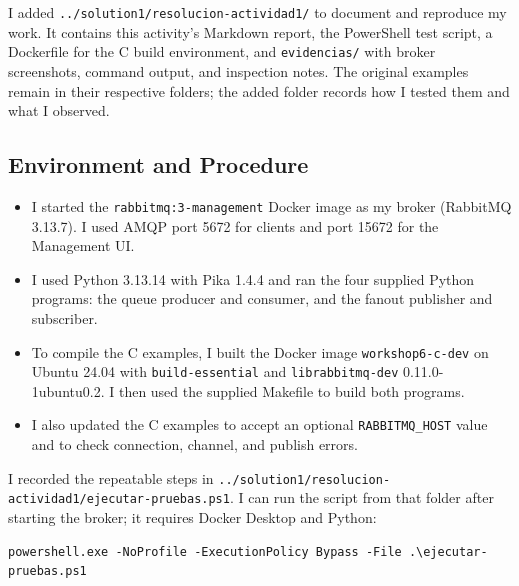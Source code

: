 ﻿\documentclass[11pt,a4paper]{article}
\begin{document}
I added \texttt{../solution1/resolucion-actividad1/} to document and reproduce my work. It contains this activity's Markdown report, the PowerShell test script, a Dockerfile for the C build environment, and \texttt{evidencias/} with broker screenshots, command output, and inspection notes. The original examples remain in their respective folders; the added folder records how I tested them and what I observed.

\subsection{Environment and Procedure}
\begin{itemize}\item I started the \texttt{rabbitmq:3-management} Docker image as my broker (RabbitMQ 3.13.7). I used AMQP port 5672 for clients and port 15672 for the Management UI.\item I used Python 3.13.14 with Pika 1.4.4 and ran the four supplied Python programs: the queue producer and consumer, and the fanout publisher and subscriber.\item To compile the C examples, I built the Docker image \texttt{workshop6-c-dev} on Ubuntu 24.04 with \texttt{build-essential} and \texttt{librabbitmq-dev} 0.11.0-1ubuntu0.2. I then used the supplied Makefile to build both programs.\item I also updated the C examples to accept an optional \texttt{RABBITMQ\_HOST} value and to check connection, channel, and publish errors.\end{itemize}
I recorded the repeatable steps in \texttt{../solution1/resolucion-actividad1/ejecutar-pruebas.ps1}. I can run the script from that folder after starting the broker; it requires Docker Desktop and Python:\begin{lstlisting}
powershell.exe -NoProfile -ExecutionPolicy Bypass -File .\ejecutar-pruebas.ps1
\end{lstlisting}
\end{document}
